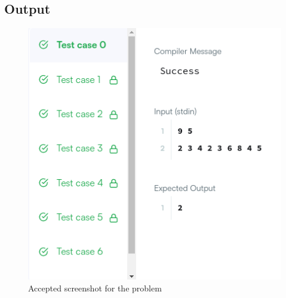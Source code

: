 \subsection{Output}
\begin{figure}[H]
    \begin{center}
        \includegraphics[scale=0.5]{img/fradulent_ac.png}
    \end{center}
    \caption{Accepted screenshot for the problem}\label{fig:}
\end{figure}

